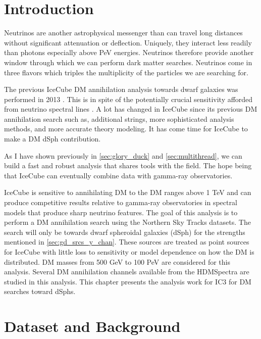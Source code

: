 \section{Introduction} \label{sec:icDM_intro}

Neutrinos are another astrophysical messenger than can travel long distances without significant attenuation or deflection.
Uniquely, they interact less readily than photons especially above PeV energies.
Neutrinos therefore provide another window through which we can perform dark matter searches.
Neutrinos come in three flavors which triples the multiplicity of the particles we are searching for.

The previous IceCube DM annihilation analysis towards dwarf galaxies was performed in 2013 \cite{IC3_DM2013}.
This is in spite of the potentially crucial sensitivity afforded from neutrino spectral lines \cite{IC3_DM_DanHooper}.
A lot has changed in IceCube since its previous DM annihilation search such as, additional strings, more sophisticated analysis methods, and more accurate theory modeling.
It has come time for IceCube to make a DM dSph contribution.

As I have shown previously in \cref{sec:glory_duck} and \cref{sec:multithread}, we can build a fast and robust analysis that shares tools with the field.
The hope being that IceCube can eventually combine data with gamma-ray observatories.

IceCube is sensitive to annihilating DM to the DM ranges above 1 TeV and can produce competitive results relative to gamma-ray observatories in spectral models that produce sharp neutrino features.
The goal of this analysis is to perform a DM annihilation search using the Northern Sky Tracks datasets.
The search will only be towards dwarf spheroidal galaxies (dSph) for the strengths mentioned in \cref{sec:gd_srcs_y_chan}.
These sources are treated as point sources for IceCube with little loss to sensitivity or model dependence on how the DM is distributed.
DM masses from 500 GeV to 100 PeV are considered for this analysis.
Several DM annihilation channels available from the HDMSpectra are studied in this analysis.
This chapter presents the analysis work for IC3 for DM searches toward dSphs.

\section{Dataset and Background}\label{sec:icDM_databgd}

